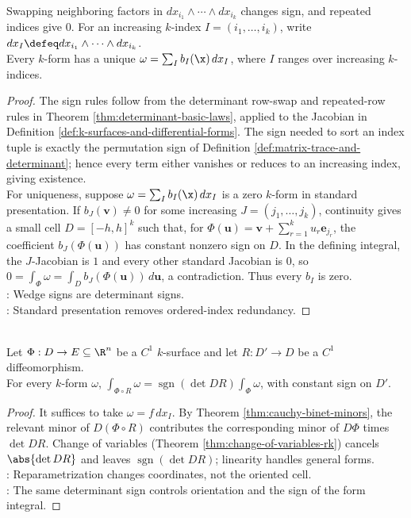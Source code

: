 \begin{proposition} \label{prop:basic-forms-standard-presentation} \\
Swapping neighboring factors in $dx_{i_1}\wedge\cdots\wedge dx_{i_k}$ changes sign, and repeated indices give $0$. For an increasing $k$-index $I=(i_1,\ldots,i_k)$, write $dx_I\defeq dx_{i_1}\wedge\cdots\wedge dx_{i_k}$.\\
Every $k$-form has a unique  $\omega=\sum_I b_I(\x)\,dx_I$, where $I$ ranges over increasing $k$-indices.
\begin{proof}
The sign rules follow from the determinant row-swap and repeated-row rules in Theorem \ref{thm:determinant-basic-laws}, applied to the Jacobian in Definition \ref{def:k-surfaces-and-differential-forms}. The sign needed to sort an index tuple is exactly the permutation sign of Definition \ref{def:matrix-trace-and-determinant}; hence every term either vanishes or reduces to an increasing index, giving existence.\\
For uniqueness, suppose $\omega=\sum_I b_I(\x)\,dx_I$ is a zero $k$-form in standard presentation. If $b_J(\mathbf{v})\neq0$ for some increasing $J=(j_1,\ldots,j_k)$, continuity gives a small cell $D=[-h,h]^k$ such that, for $\Phi(\mathbf{u})=\mathbf{v}+\sum\limits_{r=1}^{k}u_r\mathbf{e}_{j_r}$, the coefficient $b_J(\Phi(\mathbf{u}))$ has constant nonzero sign on $D$. In the defining integral, the $J$-Jacobian is $1$ and every other standard Jacobian is $0$, so $0=\int_{\Phi}\omega=\int_D b_J(\Phi(\mathbf{u}))\,d\mathbf{u}$, a contradiction. Thus every $b_I$ is zero.\\
: Wedge signs are determinant signs.\\
: Standard presentation removes ordered-index redundancy.
\end{proof}
\end{proposition}

\begin{theorem} \label{thm:forms-reparametrization-naturality} \\
Let $\Phi:D\to E\subseteq\R^n$ be a $C^1$ $k$-surface and let $R:D'\to D$ be a $C^1$ diffeomorphism.\\
For every $k$-form $\omega$, $\int_{\Phi\circ R}\omega=\operatorname{sgn}(\det DR)\int_{\Phi}\omega$, with constant sign on $D'$.
\begin{proof}
It suffices to take $\omega=f\,dx_I$. By Theorem \ref{thm:cauchy-binet-minors}, the relevant minor of $D(\Phi\circ R)$ contributes the corresponding minor of $D\Phi$ times $\det DR$. Change of variables (Theorem \ref{thm:change-of-variables-rk}) cancels $\abs{\det DR}$ and leaves $\operatorname{sgn}(\det DR)$; linearity handles general forms.\\
: Reparametrization changes coordinates, not the oriented cell.\\
: The same determinant sign controls orientation and the sign of the form integral.
\end{proof}
\end{theorem}

